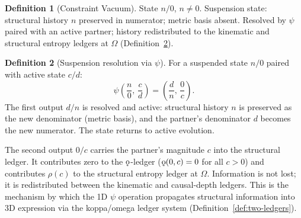 \documentclass[11pt, letterpaper]{article}
\newcommand{\rank}{\rho}
\newcommand{\koppa}{\mathbin{\text{\rm\k{o}}}}
\theoremstyle{definition}
\newtheorem{definition}{Definition}[section]
\theoremstyle{plain}
\begin{document}
\begin{definition}[Constraint Vacuum]\label{def:constraint-vac}
State $n/0$, $n\neq 0$.  Suspension state: structural history $n$ preserved
in numerator; metric basis absent.  Resolved by $\psi$ paired with an active
partner; history redistributed to the kinematic and structural entropy
ledgers at $\Omega$ (Definition~\ref{def:zero-resolution}).
\end{definition}

\begin{definition}[Suspension resolution via $\psi$]\label{def:zero-resolution}
For a suspended state $n/0$ paired with active state $c/d$:
\[
\psi\!\left(\frac{n}{0},\,\frac{c}{d}\right) = \left(\frac{d}{n},\,\frac{0}{c}\right).
\]
The first output $d/n$ is resolved and active: structural history $n$ is
preserved as the new denominator (metric basis), and the partner's denominator
$d$ becomes the new numerator.  The state returns to active evolution.

The second output $0/c$ carries the partner's magnitude $c$ into
the structural ledger.  It contributes zero to the $\koppa$-ledger
($\koppa(0,c)=0$ for all $c>0$) and contributes $\rank(c)$ to the structural
entropy ledger at $\Omega$.  Information is not lost; it is redistributed
between the kinematic and causal-depth ledgers.
This is the mechanism by which the 1D $\psi$ operation propagates
structural information into 3D expression via the koppa/omega ledger system
(Definition~\ref{def:two-ledgers}).
\end{definition}
\end{document}
